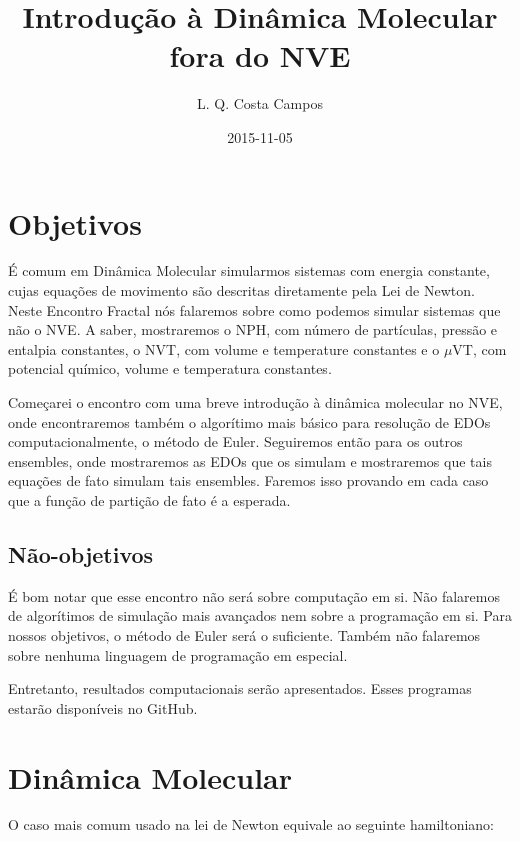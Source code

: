 \documentclass[twoside, a4paper]{article}
\begin{document}
\title{Introdução à Dinâmica Molecular fora do NVE}
\author{L. Q. Costa Campos}
\date{2015-11-05}
\maketitle

\tableofcontents

\clearpage

\section{Objetivos}

É comum em Dinâmica Molecular simularmos sistemas com energia constante, cujas equações de movimento são descritas diretamente pela Lei de Newton. Neste Encontro Fractal nós falaremos sobre como podemos simular sistemas que não o NVE. A saber, mostraremos o NPH, com número de partículas, pressão e entalpia constantes, o NVT, com volume e temperature constantes e o $\mu$VT, com potencial químico, volume e temperatura constantes.

Começarei o encontro com uma breve introdução à dinâmica molecular no NVE, onde encontraremos também o algorítimo mais básico para resolução de EDOs computacionalmente, o método de Euler. Seguiremos então para os outros ensembles, onde mostraremos as EDOs que os simulam e mostraremos que tais equações de fato simulam tais ensembles. Faremos isso provando em cada caso que a função de partição de fato é a esperada.

\subsection{Não-objetivos}

É bom notar que esse encontro não será sobre computação em si. Não falaremos de algorítimos de simulação mais avançados nem sobre a programação em si. Para nossos objetivos, o método de Euler será o suficiente. Também não falaremos sobre nenhuma linguagem de programação em especial. 

Entretanto, resultados computacionais serão apresentados. Esses programas estarão disponíveis no GitHub.

\section{Dinâmica Molecular}

O caso mais comum usado na lei de Newton equivale ao seguinte hamiltoniano:
\end{document}
